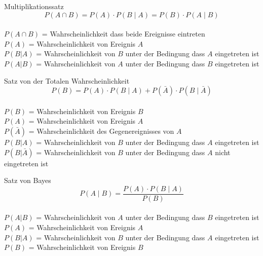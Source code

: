 \begin{theorem}{Multiplikationssatz}
$$
P(A \cap B)=P(A) \cdot P(B \mid A)=P(B) \cdot P(A \mid B)
$$
\\
$P(A \cap B)$ = Wahrscheinlichkeit dass beide Ereignisse eintreten\\
$P(A)$ = Wahrscheinlichkeit von Ereignis $A$\\
$P(B|A)$ = Wahrscheinlichkeit von $B$ unter der Bedingung dass $A$ eingetreten ist\\
$P(A|B)$ = Wahrscheinlichkeit von $A$ unter der Bedingung dass $B$ eingetreten ist\\
\end{theorem}

\begin{theorem}{Satz von der Totalen Wahrscheinlichkeit}
$$
P(B)=P(A) \cdot P(B \mid A)+P(\bar{A}) \cdot P(B \mid \bar{A})
$$
\\
$P(B)$ = Wahrscheinlichkeit von Ereignis $B$\\
$P(A)$ = Wahrscheinlichkeit von Ereignis $A$\\
$P(\bar{A})$ = Wahrscheinlichkeit des Gegenereignisses von $A$\\
$P(B|A)$ = Wahrscheinlichkeit von $B$ unter der Bedingung dass $A$ eingetreten ist\\
$P(B|\bar{A})$ = Wahrscheinlichkeit von $B$ unter der Bedingung dass $A$ nicht eingetreten ist\\
\end{theorem}

\begin{theorem}{Satz von Bayes}
$$
P(A \mid B)=\frac{P(A) \cdot P(B \mid A)}{P(B)}
$$
\\
$P(A|B)$ = Wahrscheinlichkeit von $A$ unter der Bedingung dass $B$ eingetreten ist\\
$P(A)$ = Wahrscheinlichkeit von Ereignis $A$\\
$P(B|A)$ = Wahrscheinlichkeit von $B$ unter der Bedingung dass $A$ eingetreten ist\\
$P(B)$ = Wahrscheinlichkeit von Ereignis $B$\\
\end{theorem}
